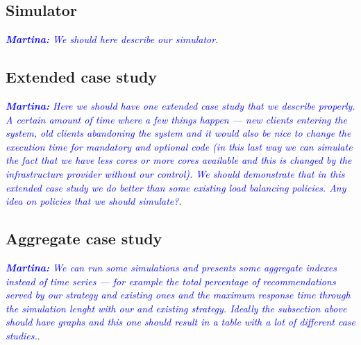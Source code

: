 \subsection{Simulator}

\textcolor{blue}{\textit{\textbf{Martina:} We should here describe our
    simulator}}.

\subsection{Extended case study}

\textcolor{blue}{\textit{\textbf{Martina:} Here we should have one
    extended case study that we describe properly. A certain amount of
    time where a few things happen --- new clients entering the
    system, old clients abandoning the system and it would also be
    nice to change the execution time for mandatory and optional code
    (in this last way we can simulate the fact that we have less cores
    or more cores available and this is changed by the infrastructure
    provider without our control). We should demonstrate that in this
    extended case study we do better than some existing load balancing
    policies. Any idea on policies that we should simulate?}}.

\subsection{Aggregate case study}

\textcolor{blue}{\textit{\textbf{Martina:} We can run some simulations
    and presents some aggregate indexes instead of time series --- for
    example the total percentage of recommendations served by our
    strategy and existing ones and the maximum response time through
    the simulation lenght with our and existing strategy. Ideally the
    subsection above should have graphs and this one should result in
    a table with a lot of different case studies.}}.



